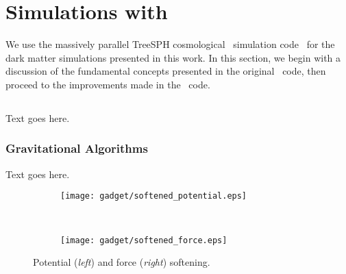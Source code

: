 
%
%

\section{Simulations with \gadgettwo}
\label{sec:gadget}



We use the massively parallel TreeSPH cosmological \nbody\ simulation code \gadgettwo\ for the dark matter simulations presented in this work.  In this section, we begin with a discussion of the fundamental concepts presented in the original \gadget\ code, then proceed to the improvements made in the \gadgettwo\ code.




\subsection{\gadgettwo}
\label{subsec:gadget--gadget}


Text goes here.



\subsubsection{Gravitational Algorithms}
\label{subsubsec:gadget--gadget--gravitational_algorithms}


Text goes here.

\begin{figure}[t]
	\centering
	\begin{subfigure}{}
		\texttt{[image: gadget/softened\_potential.eps]}
	\end{subfigure}
	~
	\begin{subfigure}{}
		\texttt{[image: gadget/softened\_force.eps]}
	\end{subfigure}
	\caption[Potential and force softening.]{Potential (\emph{left}) and force (\emph{right}) softening.}
	\label{fig:gadget--softening}
\end{figure}

